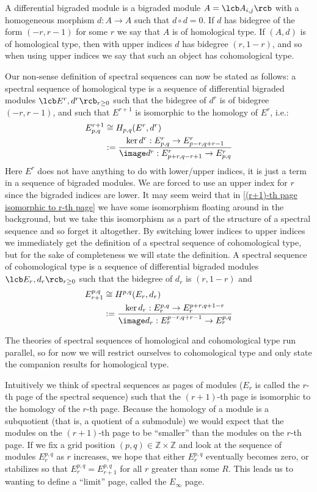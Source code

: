 A differential bigraded module is a bigraded module $A = \lcb A_{i,j} \rcb$ with a homogeneous morphism $d : A \rightarrow A$ such that $d \circ d = 0$. If $d$ has bidegree of the form $(-r,r-1)$ for some $r$ we say that $A$ is of homological type. If $(A,d)$ is of homological type, then with upper indices $d$ has bidegree $(r,1-r)$, and so when using upper indices we say that such an object has cohomological type.

Our non-sense definition of spectral sequences can now be stated as follows: a spectral sequence of homological type is a sequence of differential bigraded modules $\lcb E^r,d^r \rcb_{r \geq 0}$ such that the bidegree of $d^r$ is of bidegree $(-r,r-1)$, and such that $E^{r+1}$ is isomorphic to the homology of $E^r$, i.e.:
\begin{align}
\label{(r+1)-th page isomorphic to r-th page}
	E^{r+1}_{p,q} &\cong H_{p,q}(E^r,d^r) \\
	              &:= \frac{ \ker d^r : E_{p,q}^r \rightarrow E_{p-r,q+r-1}^r }{ \image d^r : E_{p+r,q-r+1}^r \rightarrow E_{p,q}^r }
\end{align}
Here $E^r$ does not have anything to do with lower/upper indices, it is just a term in a sequence of bigraded modules. We are forced to use an upper index for $r$ since the bigraded indices are lower. It may seem weird that in \eqref{(r+1)-th page isomorphic to r-th page} we have some isomorphism floating around in the background, but we take this isomorphism as a part of the structure of a spectral sequence and so forget it altogether. By switching lower indices to upper indices we immediately get the definition of a spectral sequence of cohomological type, but for the sake of completeness we will state the definition. A spectral sequence of cohomological type is a sequence of differential bigraded modules $\lcb E_r, d_r \rcb_{r \geq 0}$ such that the bidegree of $d_r$ is $(r,1-r)$ and
\begin{align}
	E_{r+1}^{p,q} &\cong H^{p,q}(E_r,d_r) \\
	              &:= \frac{ \ker d_r : E_r^{p,q} \rightarrow E_r^{p+r,q+1-r} }{ \image d_r : E_r^{p-r,q+r-1} \rightarrow E_r^{p,q} }
\end{align}

The theories of spectral sequences of homological and cohomological type run parallel, so for now we will restrict ourselves to cohomological type and only state the companion results for homological type.

Intuitively we think of spectral sequences as pages of modules ($E_r$ is called the $r$-th page of the spectral sequence) such that the $(r+1)$-th page is isomorphic to the homology of the $r$-th page. Because the homology of a module is a subquotient (that is, a quotient of a submodule) we would expect that the modules on the $(r+1)$-th page to be ``smaller'' than the modules on the $r$-th page. If we fix a grid position $(p,q) \in \mathbb Z \times \mathbb Z$ and look at the sequence of modules $E_r^{p,q}$ as $r$ increases, we hope that either $E_r^{p,q}$ eventually becomes zero, or stabilizes so that $E_r^{p,q} = E_{r+1}^{p,q}$ for all $r$ greater than some $R$. This leads us to wanting to define a ``limit'' page, called the $E_\infty$ page.

